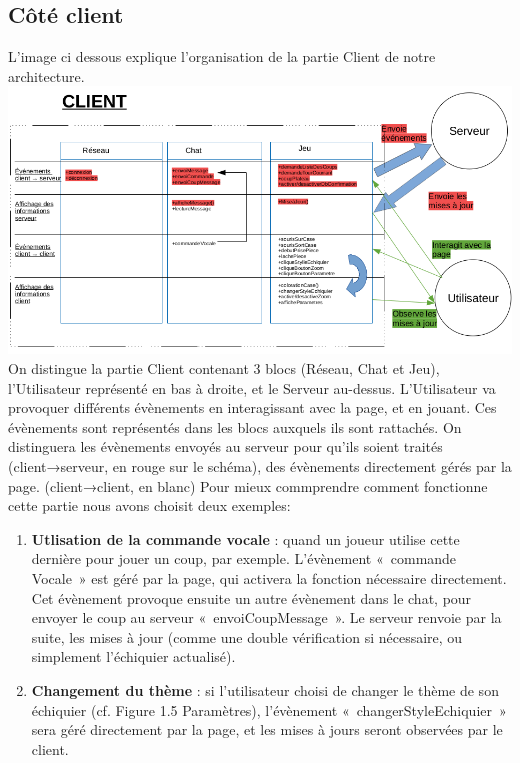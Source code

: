 \documentclass[12pt, openany]{report}
\begin{document}
\subsection{Côté client}

L'image ci dessous explique l'organisation de la partie Client de notre architecture.\newline
\includegraphics[width=16cm]{Client.png}
On distingue la partie Client contenant 3 blocs (Réseau, Chat et Jeu), l’Utilisateur représenté en bas à droite, et le Serveur au-dessus.
\newline
L’Utilisateur va provoquer différents évènements en interagissant avec la page, et en jouant. Ces évènements sont représentés dans les blocs auxquels ils sont rattachés. On distinguera les évènements envoyés au serveur pour qu’ils soient traités (client→serveur, en rouge sur le schéma), des évènements directement gérés par la page. (client→client, en blanc)
\newline
Pour mieux commprendre comment fonctionne cette partie nous avons choisit deux exemples:
\begin{enumerate}
    \item \textbf {Utlisation de la commande vocale} : quand un joueur utilise cette dernière pour jouer un coup, par exemple. L’évènement « commande Vocale » est géré par la page, qui activera la fonction nécessaire directement. Cet évènement provoque ensuite un autre évènement dans le chat, pour envoyer le coup au serveur « envoiCoupMessage ». Le serveur renvoie par la suite, les mises à jour (comme une double vérification si nécessaire, ou simplement l’échiquier actualisé).
    \item \textbf {Changement du thème} : si l’utilisateur choisi de changer le thème de son échiquier (cf. Figure 1.5 Paramètres), l’évènement « changerStyleEchiquier » sera géré directement par la page, et les mises à jours seront observées par le client.
\end{enumerate}{}
\end{document}
